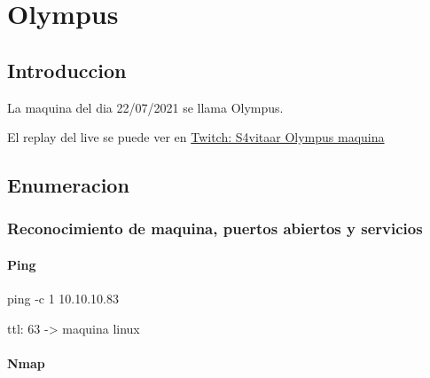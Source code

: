 \documentclass{assets/ipesethesis}
\newenvironment{Shaded}{\begin{snugshade}}{\end{snugshade}}
\newcommand{\FunctionTok}[1]{\textcolor[rgb]{0.00,0.00,0.00}{#1}}
\newcommand{\NormalTok}[1]{#1}
\begin{document}
\hypertarget{olympus}{%
\chapter*{Olympus}\label{olympus}}

\hypertarget{introduccion}{%
\section*{Introduccion}\label{introduccion}}

La maquina del dia 22/07/2021 se llama Olympus.

El replay del live se puede ver en \href{https://www.twitch.tv/videos/1094808182}{Twitch: S4vitaar Olympus maquina}

\hypertarget{enumeracion}{%
\section*{Enumeracion}\label{enumeracion}}

\hypertarget{reconocimiento-de-maquina-puertos-abiertos-y-servicios}{%
\subsection*{Reconocimiento de maquina, puertos abiertos y servicios}\label{reconocimiento-de-maquina-puertos-abiertos-y-servicios}}

\hypertarget{ping}{%
\subsubsection*{Ping}\label{ping}}

\begin{Shaded}
\begin{Highlighting}[]
\FunctionTok{ping}\NormalTok{ -c 1 10.10.10.83}
\end{Highlighting}
\end{Shaded}

ttl: 63 -\textgreater{} maquina linux

\hypertarget{nmap}{%
\subsubsection*{Nmap}\label{nmap}}
\end{document}
